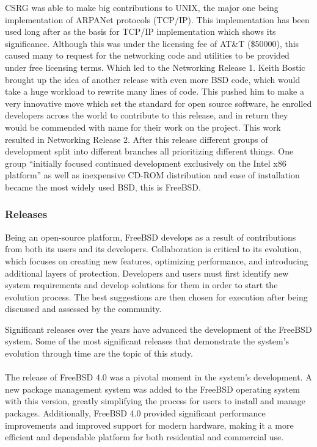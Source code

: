 \documentclass[12pt, dvipsnames, a4paper]{article}
\begin{document}
CSRG was able to make big contributions to UNIX, the major one being implementation of ARPANet protocols (TCP/IP). This implementation has been used long after as the basis for TCP/IP implementation which shows its significance.
Although this was under the licensing fee of AT\&T (\$50000), this caused many to request for the networking code and utilities to be provided under free licensing terms. Which led to the Networking Release 1. Keith Bostic brought up the idea of another release with even more BSD code, which would take a huge workload to rewrite many lines of code. This pushed him to make a very innovative move which set the standard for open source software, he enrolled developers across the world to contribute to this release, and in return they would be commended with name for their work on the project. This work resulted in Networking Release 2.
After this release different groups of development split into different branches all prioritizing different things. One group “initially focused continued development exclusively on the Intel x86 platform” \cite{david} as well as inexpensive CD-ROM distribution and ease of installation became the most widely used BSD, this is FreeBSD.

\subsubsection{Releases}
Being an open-source platform, FreeBSD develops as a result of contributions from both its users and its developers. Collaboration is critical to its evolution, which focuses on creating new features, optimizing performance, and introducing additional layers of protection. Developers and users must first identify new system requirements and develop solutions for them in order to start the evolution process. The best suggestions are then chosen for execution after being discussed and assessed by the community.

Significant releases over the years have advanced the development of the FreeBSD system. Some of the most significant releases that demonstrate the system's evolution through time are the topic of this study.\\\\
The release of FreeBSD 4.0 was a pivotal moment in the system's development. A new package management system was added to the FreeBSD operating system with this version, greatly simplifying the process for users to install and manage packages. Additionally, FreeBSD 4.0 provided significant performance improvements and improved support for modern hardware, making it a more efficient and dependable platform for both residential and commercial use.\\
\end{document}
